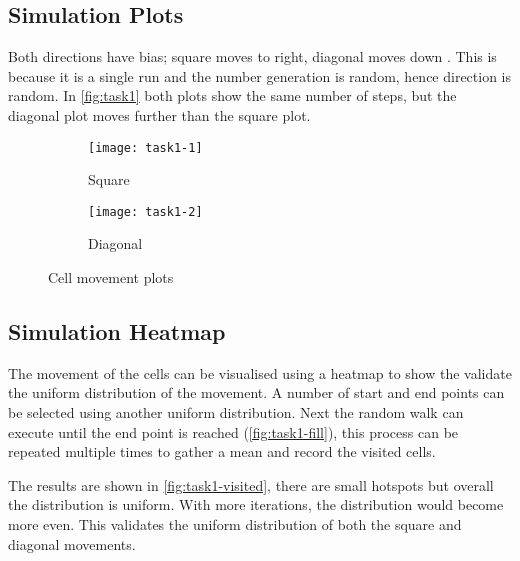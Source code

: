 


\subsection{Simulation Plots}

Both directions have bias; square moves to right, diagonal moves down .
This is because it is a single run and the number generation is random, hence direction is random.
In \autoref{fig:task1} both plots show the same number of steps, but the diagonal plot moves further than the square plot.

\begin{figure}[!ht]
    \centering
    \begin{subfigure}{0.4\textwidth}
    	\texttt{[image: task1-1]}
    	\caption[Square]{Square}
    	\label{fig:task1-1}
    \end{subfigure}
    \begin{subfigure}{0.4\textwidth}
    	\texttt{[image: task1-2]}
    	\caption[Diagonal]{Diagonal}
    	\label{fig:task1-2}
	\end{subfigure}
	\caption[Cell movement plots]{Cell movement plots}
    \label{fig:task1}
\end{figure}

\clearpage

\subsection{Simulation Heatmap}

The movement of the cells can be visualised using a heatmap to show the validate the uniform distribution of the movement.
A number of start and end points can be selected using another uniform distribution.
Next the random walk can execute until the end point is reached (\autoref{fig:task1-fill}),
this process can be repeated multiple times to gather a mean and record the visited cells.


The results are shown in \autoref{fig:task1-visited}, there are small hotspots but overall the distribution is uniform.
With more iterations, the distribution would become more even.
This validates the uniform distribution of both the square and diagonal movements.

